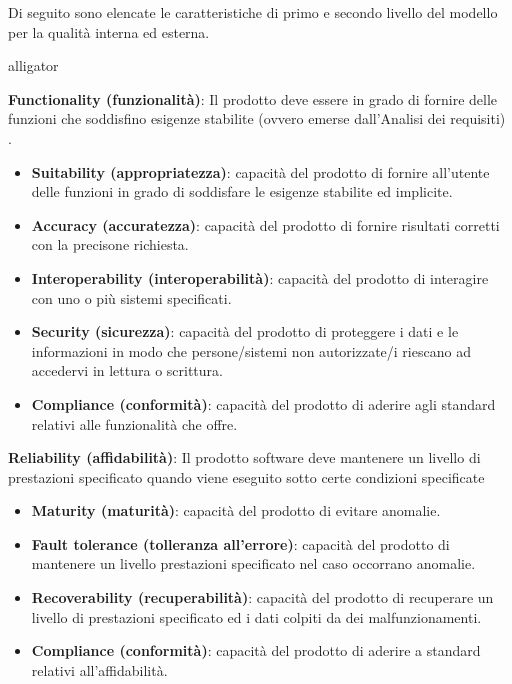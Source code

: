 Di seguito sono elencate le caratteristiche di primo e secondo livello del modello per la qualità interna ed esterna.
\begin{labeling}{alligator}
	\item \textbf{Functionality (funzionalità)}: Il prodotto deve essere in grado di fornire delle funzioni che soddisfino esigenze stabilite (ovvero emerse dall'Analisi dei requisiti) \marginpar{\textcolor{red}{mettere ref a doc}}.
	\begin{itemize}
		\item \textbf{Suitability (appropriatezza)}: capacità del prodotto di fornire all'utente delle funzioni in grado di soddisfare le esigenze stabilite ed implicite. 
		
		\item \textbf{Accuracy (accuratezza)}: capacità del prodotto di fornire risultati corretti con la precisone richiesta. 
		
		\item \textbf{Interoperability (interoperabilità)}: capacità del prodotto di interagire con uno o più sistemi specificati. 
		
		\item \textbf{Security (sicurezza)}: capacità del prodotto di proteggere i dati e le informazioni in modo che persone/sistemi non autorizzate/i riescano ad accedervi in lettura o scrittura.
		
		\item \textbf{Compliance (conformità)}: capacità del prodotto di aderire agli standard relativi alle funzionalità che offre.
	\end{itemize}
	\item \textbf{Reliability (affidabilità)}: Il prodotto software deve mantenere un livello di prestazioni specificato quando viene eseguito sotto certe condizioni specificate
	\begin{itemize}
		\item \textbf{Maturity (maturità)}: capacità del prodotto di evitare anomalie.
		
		\item \textbf{Fault tolerance (tolleranza all'errore)}: capacità del prodotto di mantenere un livello prestazioni specificato nel caso occorrano anomalie.
		
		\item \textbf{Recoverability (recuperabilità)}: capacità del prodotto di recuperare un livello di prestazioni specificato ed i dati colpiti da dei malfunzionamenti.
		
		\item \textbf{Compliance (conformità)}: capacità del prodotto di aderire a standard relativi all'affidabilità.
	\end{itemize}
	

\end{labeling}
